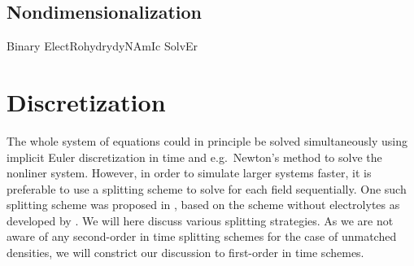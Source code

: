 \documentclass[preprint,pre,superscriptaddress,a4paper]{revtex4-1}
\begin{document}
\subsection{Nondimensionalization}
Binary ElectRohydrydyNAmIc SolvEr

\section{Discretization}
The whole system of equations could in principle be solved simultaneously using implicit Euler discretization in time and e.g.~Newton's method to solve the nonliner system.
However, in order to simulate larger systems faster, it is preferable to use a splitting scheme to solve for each field sequentially.
One such splitting scheme was proposed in \cite{metzger2015}, based on the scheme without electrolytes as developed by \cite{guillen-gonzalez2014,grun2016}.
We will here discuss various splitting strategies.
As we are not aware of any second-order in time splitting schemes for the case of unmatched densities, we will constrict our discussion to first-order in time schemes.
\end{document}
